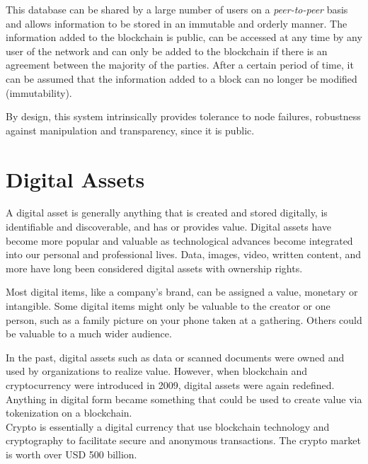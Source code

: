 \documentclass[MSE,Master,english]{twbook}%
\begin{document}
This database can be shared by a large number of users on a \emph{peer-to-peer} basis and allows information to be stored in an immutable and orderly manner. The information added to the blockchain is public, can be accessed at any time by any user of the network and can only be added to the blockchain if there is an agreement between the majority of the parties. After a certain period of time, it can be assumed that the information added to a block can no longer be modified (immutability).

By design, this system intrinsically provides tolerance to node failures, robustness against manipulation and transparency, since it is public.

\section{Digital Assets}
A digital asset\cite{digAssets} is generally anything that is created and stored digitally, is identifiable and discoverable, and has or provides value. Digital assets have become more popular and valuable as technological advances become integrated into our personal and professional lives. Data, images, video, written content, and more have long been considered digital assets with ownership rights.

Most digital items, like a company's brand, can be assigned a value, monetary or intangible. Some digital items might only be valuable to the creator or one person, such as a family picture on your phone taken at a gathering. Others could be valuable to a much wider audience.

In the past, digital assets such as data or scanned documents were owned and used by organizations to realize value. However, when blockchain and cryptocurrency were introduced in 2009, digital assets were again redefined. Anything in digital form became something that could be used to create value via tokenization on a blockchain. \\

\ac{Crypto} is essentially a digital currency that use blockchain technology and cryptography to facilitate secure and anonymous transactions. The crypto market is worth over USD 500 billion.\cite{crypto}
\end{document}
